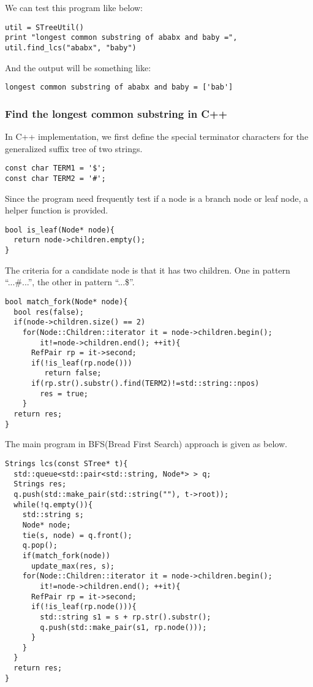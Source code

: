 \documentclass{article}
\begin{document}
We can test this program like below:

\begin{lstlisting}
util = STreeUtil()
print "longest common substring of ababx and baby =", util.find_lcs("ababx", "baby")
\end{lstlisting}

And the output will be something like:
\begin{verbatim}
longest common substring of ababx and baby = ['bab']
\end{verbatim}

\subsubsection*{Find the longest common substring in C++}
In C++ implementation, we first define the special terminator
characters for the generalized suffix tree of two strings.

\lstset{language=C++}
\begin{lstlisting}
const char TERM1 = '$';
const char TERM2 = '#';
\end{lstlisting} %

Since the program need frequently test if a node is a branch
node or leaf node, a helper function is provided.

\begin{lstlisting}
bool is_leaf(Node* node){
  return node->children.empty();
}
\end{lstlisting}

The criteria for a candidate node is that it has two children.
One in pattern ``...\#...'', the other in pattern ``...\$''. 

\begin{lstlisting}
bool match_fork(Node* node){
  bool res(false);
  if(node->children.size() == 2)
    for(Node::Children::iterator it = node->children.begin();
        it!=node->children.end(); ++it){
      RefPair rp = it->second;
      if(!is_leaf(rp.node()))
         return false;
      if(rp.str().substr().find(TERM2)!=std::string::npos)
        res = true;
    }
  return res;
}
\end{lstlisting}

The main program in BFS(Bread First Search) approach is given
as below.

\begin{lstlisting}
Strings lcs(const STree* t){
  std::queue<std::pair<std::string, Node*> > q;
  Strings res;
  q.push(std::make_pair(std::string(""), t->root));
  while(!q.empty()){
    std::string s;
    Node* node;
    tie(s, node) = q.front();
    q.pop();
    if(match_fork(node))
      update_max(res, s);
    for(Node::Children::iterator it = node->children.begin();
        it!=node->children.end(); ++it){
      RefPair rp = it->second;
      if(!is_leaf(rp.node())){
        std::string s1 = s + rp.str().substr();
        q.push(std::make_pair(s1, rp.node()));
      }
    }
  }
  return res;
}
\end{lstlisting}
\end{document}
